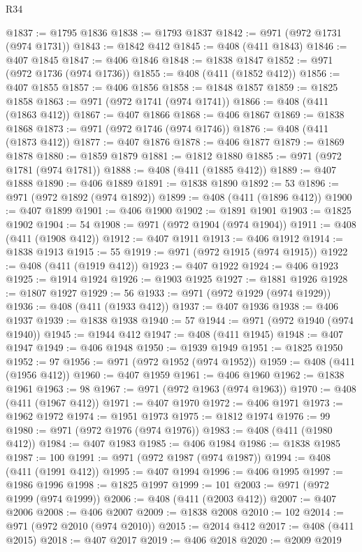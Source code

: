 \begin{lexlean}{R34}
\begin{coremodule}
@1837 := @1795 @1836
@1838 := @1793 @1837
@1842 := @971 (@972 @1731 (@974 @1731))
@1843 := @1842 @412
@1845 := @408 (@411 @1843)
@1846 := @407 @1845
@1847 := @406 @1846
@1848 := @1838 @1847
@1852 := @971 (@972 @1736 (@974 @1736))
@1855 := @408 (@411 (@1852 @412))
@1856 := @407 @1855
@1857 := @406 @1856
@1858 := @1848 @1857
@1859 := @1825 @1858
@1863 := @971 (@972 @1741 (@974 @1741))
@1866 := @408 (@411 (@1863 @412))
@1867 := @407 @1866
@1868 := @406 @1867
@1869 := @1838 @1868
@1873 := @971 (@972 @1746 (@974 @1746))
@1876 := @408 (@411 (@1873 @412))
@1877 := @407 @1876
@1878 := @406 @1877
@1879 := @1869 @1878
@1880 := @1859 @1879
@1881 := @1812 @1880
@1885 := @971 (@972 @1781 (@974 @1781))
@1888 := @408 (@411 (@1885 @412))
@1889 := @407 @1888
@1890 := @406 @1889
@1891 := @1838 @1890
@1892 := 53
@1896 := @971 (@972 @1892 (@974 @1892))
@1899 := @408 (@411 (@1896 @412))
@1900 := @407 @1899
@1901 := @406 @1900
@1902 := @1891 @1901
@1903 := @1825 @1902
@1904 := 54
@1908 := @971 (@972 @1904 (@974 @1904))
@1911 := @408 (@411 (@1908 @412))
@1912 := @407 @1911
@1913 := @406 @1912
@1914 := @1838 @1913
@1915 := 55
@1919 := @971 (@972 @1915 (@974 @1915))
@1922 := @408 (@411 (@1919 @412))
@1923 := @407 @1922
@1924 := @406 @1923
@1925 := @1914 @1924
@1926 := @1903 @1925
@1927 := @1881 @1926
@1928 := @1807 @1927
@1929 := 56
@1933 := @971 (@972 @1929 (@974 @1929))
@1936 := @408 (@411 (@1933 @412))
@1937 := @407 @1936
@1938 := @406 @1937
@1939 := @1838 @1938
@1940 := 57
@1944 := @971 (@972 @1940 (@974 @1940))
@1945 := @1944 @412
@1947 := @408 (@411 @1945)
@1948 := @407 @1947
@1949 := @406 @1948
@1950 := @1939 @1949
@1951 := @1825 @1950
@1952 := 97
@1956 := @971 (@972 @1952 (@974 @1952))
@1959 := @408 (@411 (@1956 @412))
@1960 := @407 @1959
@1961 := @406 @1960
@1962 := @1838 @1961
@1963 := 98
@1967 := @971 (@972 @1963 (@974 @1963))
@1970 := @408 (@411 (@1967 @412))
@1971 := @407 @1970
@1972 := @406 @1971
@1973 := @1962 @1972
@1974 := @1951 @1973
@1975 := @1812 @1974
@1976 := 99
@1980 := @971 (@972 @1976 (@974 @1976))
@1983 := @408 (@411 (@1980 @412))
@1984 := @407 @1983
@1985 := @406 @1984
@1986 := @1838 @1985
@1987 := 100
@1991 := @971 (@972 @1987 (@974 @1987))
@1994 := @408 (@411 (@1991 @412))
@1995 := @407 @1994
@1996 := @406 @1995
@1997 := @1986 @1996
@1998 := @1825 @1997
@1999 := 101
@2003 := @971 (@972 @1999 (@974 @1999))
@2006 := @408 (@411 (@2003 @412))
@2007 := @407 @2006
@2008 := @406 @2007
@2009 := @1838 @2008
@2010 := 102
@2014 := @971 (@972 @2010 (@974 @2010))
@2015 := @2014 @412
@2017 := @408 (@411 @2015)
@2018 := @407 @2017
@2019 := @406 @2018
@2020 := @2009 @2019

\end{coremodule}
\end{lexlean}
